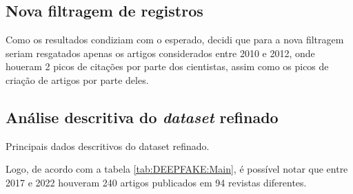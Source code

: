 \subsection{Nova filtragem de registros}

Como os resultados condiziam com o esperado, decidi que para a nova filtragem seriam resgatados apenas os artigos considerados entre 2010 e 2012, onde houeram 2 picos de citações por parte dos cientistas, assim como os picos de criação de artigos por parte deles.


\subsection{Análise descritiva do \textit{dataset} refinado}

\begin{table}[]
    \centering
{}
    \caption{Principais dados descritivos do dataset refinado.}
    \label{tab:DEEPFAKE:Main}
\end{table}

Logo, de acordo com a tabela \ref{tab:DEEPFAKE:Main}, é possível notar que entre 2017 e 2022 houveram 240 artigos publicados em 94 revistas diferentes.